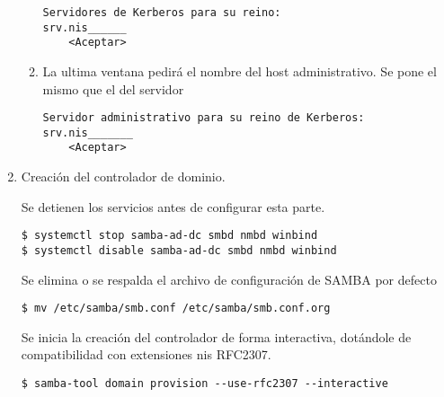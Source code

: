 \documentclass[../main.tex]{subfiles}
\begin{document}
\begin{enumerate}
\begin{enumerate}
                \begin{listing}[H]
\begin{verbatim}
Servidores de Kerberos para su reino:
srv.nis______
    <Aceptar>
\end{verbatim}
\end{listing}

          \item La ultima ventana pedirá el nombre del host administrativo.
                Se pone el mismo que el del servidor

                \begin{listing}[H]
\begin{verbatim}
Servidor administrativo para su reino de Kerberos:
srv.nis_______
    <Aceptar>
\end{verbatim}
\end{listing}



        \end{enumerate}

  \item Creación del controlador de dominio.

        Se detienen los servicios antes de configurar esta parte.

        \begin{listing}[H]
\begin{verbatim}
$ systemctl stop samba-ad-dc smbd nmbd winbind
$ systemctl disable samba-ad-dc smbd nmbd winbind
\end{verbatim}
\end{listing}

        Se elimina o se respalda el archivo de configuración de
        \Gls{SAMBA} por defecto
        \begin{listing}[H]
\begin{verbatim}
$ mv /etc/samba/smb.conf /etc/samba/smb.conf.org
\end{verbatim}
\end{listing}

        Se inicia la creación del controlador de forma interactiva, dotándole de compatibilidad con extensiones \acrshort{nis} RFC2307.

        \begin{listing}[H]
\begin{verbatim}
$ samba-tool domain provision --use-rfc2307 --interactive
\end{verbatim}
\end{listing}


\end{enumerate}
\end{document}
